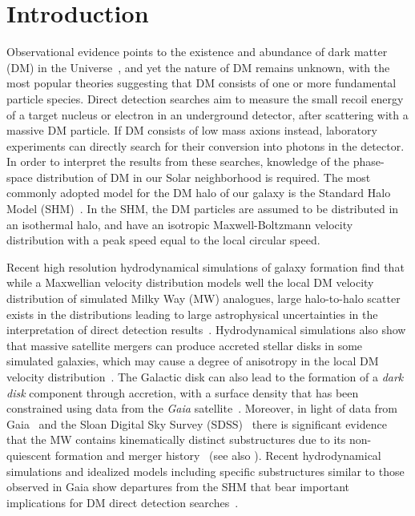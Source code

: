 \section{Introduction}
\label{Introduction}


Observational evidence points to the existence and abundance of dark matter (DM) in the Universe~\cite{Planck:2015fie}, and yet the  nature of DM remains unknown,  with the most popular theories suggesting that DM consists of one or more fundamental particle species. 
Direct detection searches aim to measure the small recoil energy of a target nucleus or electron  in an underground detector, after scattering with a massive DM particle. If DM consists of low mass axions instead, laboratory experiments can directly search for their conversion into photons in the detector. In order to interpret the results from these searches, knowledge of the phase-space distribution of DM in our Solar neighborhood is required. The most commonly adopted model for the DM halo of our galaxy is the Standard Halo Model (SHM)~\cite{Drukier:1986tm}. In the SHM, the DM particles are assumed to be distributed in an isothermal halo, and have an isotropic Maxwell-Boltzmann velocity distribution with a peak speed equal to the local circular speed.

Recent high resolution hydrodynamical simulations of galaxy formation find that while a Maxwellian velocity distribution models well the local DM velocity distribution of simulated Milky Way (MW) analogues, large halo-to-halo scatter exists in the distributions leading to large astrophysical uncertainties in the interpretation of direct detection results~\cite{Bozorgnia:2016ogo, Kelso:2016qqj, Sloane:2016kyi,  Bozorgnia:2017brl,  Bozorgnia:2019mjk, Poole-McKenzie:2020dbo, Lawrence:2022niq, Kuhlen:2013tra, Lacroix:2020lhn}.  
Hydrodynamical simulations also show that massive satellite mergers can  produce accreted stellar disks in some simulated galaxies, which may cause a degree of anisotropy in 
the local DM velocity distribution~\cite{Gomez:2017yzr}. The Galactic disk can also lead to the formation of a \emph{dark disk} component through accretion, with a surface density that has been  constrained using data from the \textit{Gaia} satellite~\cite{Widmark:2021gqx, Buch:2018qdr, Schutz:2017tfp}. Moreover, in light of data from 
Gaia~\cite{Gaia:2018ydn} and the Sloan Digital Sky Survey (SDSS)~\cite{SDSS:2000hjo} there is significant evidence that the MW contains kinematically distinct substructures due to its non-quiescent formation and merger history~\cite{Evans_2019,  Myeong:2019mvy, Helmi_2018, OHare:2019qxc, OHare:2018trr,  Aguado:2020kki, Necib:2018iwb, Necib:2019zbk} (see also \cite{Necib:2018igl, Bozorgnia:2018pfa, Maity:2022enp}). Recent hydrodynamical simulations and idealized models including specific substructures similar to those observed in Gaia show departures from the SHM that bear important implications for DM direct detection searches~\cite{Bozorgnia:2019mjk, Evans:2018bqy}. 



